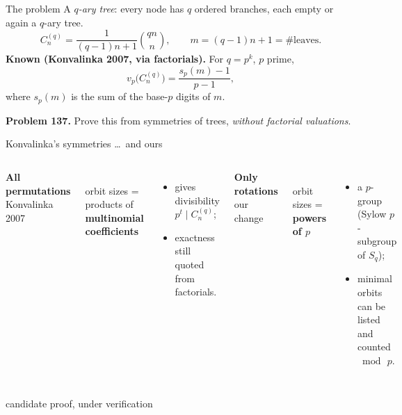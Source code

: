 \documentclass[aspectratio=169,11pt]{beamer}
\newcommand{\claimstatus}{candidate proof, under verification}
\newcommand{\status}{\par\vfill{\tiny\color{gray}\claimstatus\par}}
\newcommand{\vp}{v_p}
\newcommand{\sd}{s_p}
\newcommand{\Z}{\mathbb{Z}}
\newcommand{\Cq}{C_n^{(q)}}
\begin{document}
\begin{frame}{The problem}
  A \emph{$q$-ary tree}: every node has $q$ ordered branches,
  each empty or again a $q$-ary tree.
  \[
    \Cq=\frac{1}{(q-1)n+1}\binom{qn}{n},\qquad
    m=(q-1)n+1=\#\text{leaves}.
  \]
  \textbf{Known (Konvalinka 2007, via factorials).}
  For $q=p^k$, $p$ prime,
  \[
    \vp\!\bigl(\Cq\bigr)=\frac{\sd(m)-1}{p-1},
  \]
  where $\sd(m)$ is the sum of the base-$p$ digits of $m$.
  \bigskip

  \textbf{Problem 137.} Prove this \alert{from symmetries of trees},
  \emph{without factorial valuations}.
\end{frame}

\begin{frame}{Konvalinka's symmetries \dots\ and ours}
  \begin{columns}[T]
      \centering\textbf{All permutations}\\[2pt]
      {\small Konvalinka 2007}\\[6pt]
      \\[4pt]
      orbit sizes = products of\\ \textbf{multinomial coefficients}
      \begin{itemize}\small
        \item gives divisibility $p^t\mid\Cq$;
        \item exactness still quoted from factorials.
      \end{itemize}
      \centering\textbf{Only rotations}\\[2pt]
      {\small our change}\\[6pt]
      \\[4pt]
      orbit sizes = \textbf{powers of $p$}
      \begin{itemize}\small
        \item a $p$-group (Sylow $p$-subgroup of $S_q$);
        \item minimal orbits can be listed and counted $\bmod\,p$.
      \end{itemize}
  \end{columns}
  \status
\end{frame}
\end{document}
